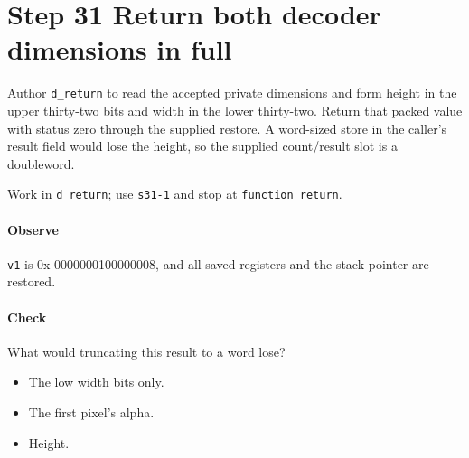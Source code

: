 \section{Step 31 Return both decoder dimensions in full}\label{qoi-s31}
Author \texttt{d\_return} to read the accepted private dimensions and form height in the upper thirty-two bits and width in the lower thirty-two. Return that packed value with status zero through the supplied restore. A word-sized store in the caller’s result field would lose the height, so the supplied count/result slot is a doubleword.

Work in \texttt{d\_return}; use \texttt{s31-1} and stop at \texttt{function\_return}.

\paragraph{Observe} \texttt{v1} is 0x 0000000100000008, and all saved registers and the stack pointer are restored.

\paragraph{Check} What would truncating this result to a word lose?
\begin{itemize}
  \item[A.] The low width bits only.
  \item[B.] The first pixel’s alpha.
  \item[C.] Height.
\end{itemize}
